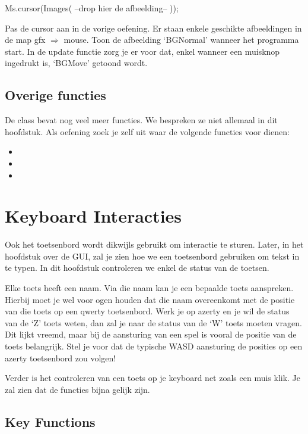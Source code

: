 \begin{code}
  Ms.cursor(Images( --drop hier de afbeelding-- ));
\end{code}

\begin{exercise}
Pas de cursor aan in de vorige oefening. Er staan enkele geschikte afbeeldingen in de map gfx $\Rightarrow$ mouse. Toon de afbeelding `BGNormal' wanneer het programma start. In de update functie zorg je er voor dat, enkel wanneer een muisknop ingedrukt is, `BGMove' getoond wordt.
\end{exercise}

\subsection{Overige functies}
De class  bevat nog veel meer functies. We bespreken ze niet allemaal in dit hoofdstuk. Als oefening zoek je zelf uit waar de volgende functies voor dienen: 

\begin{itemize}
	\item {}
	\item {}
	\item {}
\end{itemize}

\section{Keyboard Interacties}
Ook het toetsenbord wordt dikwijls gebruikt om interactie te sturen. Later, in het hoofdstuk over de GUI, zal je zien hoe we een toetsenbord gebruiken om tekst in te typen. In dit hoofdstuk controleren we enkel de status van de toetsen.

Elke toets heeft een naam. Via die naam kan je een bepaalde toets aanspreken. Hierbij moet je wel voor ogen houden dat die naam overeenkomt met de positie van die toets op een qwerty toetsenbord. Werk je op azerty en je wil de status van de `Z' toets weten, dan zal je naar de status van de `W' toets moeten vragen. Dit lijkt vreemd, maar bij de aansturing van een spel is vooral de positie van de toets belangrijk. Stel je voor dat de typische WASD aansturing de posities op een azerty toetsenbord zou volgen!

Verder is het controleren van een toets op je keyboard net zoals een muis klik. Je zal zien dat de functies bijna gelijk zijn.

\subsection{Key Functions}

